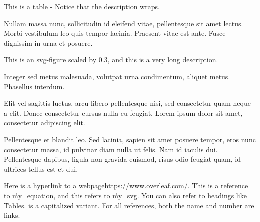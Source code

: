 \documentclass{textbook}
\begin{document}
    {This is a table - Notice that the description wraps.}

Nullam massa nunc, sollicitudin id eleifend vitae, pellentesque sit amet lectus. Morbi vestibulum leo quis tempor lacinia. Praesent vitae est ante. Fusce dignissim in urna et posuere.

    {This is an svg-figure scaled by 0.3, and this is a very long description.}

Integer sed metus malesuada, volutpat urna condimentum, aliquet metus. Phasellus interdum.

Elit vel sagittis luctus, arcu libero pellentesque nisi, sed consectetur quam neque a elit. Donec consectetur cursus nulla eu feugiat. Lorem ipsum dolor sit amet, consectetur adipiscing elit.


Pellentesque et blandit leo. Sed lacinia, sapien sit amet posuere tempor, eros nunc consectetur massa, id pulvinar diam nulla ut felis. Nam id iaculis dui. Pellentesque dapibus, ligula non gravida euismod, risus odio feugiat quam, id ultrices tellus est et dui.

Here is a hyperlink to a \url{webpage}{https://www.overleaf.com/}. This is a reference to \r{my_equation}, and this refers to \r{my_svg}. You can also refer to headings like \r{Tables}.  is a capitalized variant. For all references, both the name and number are links.
\end{document}
